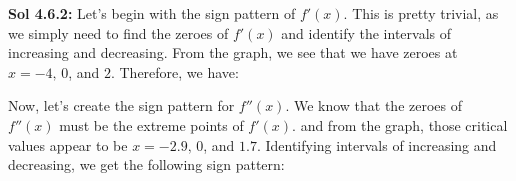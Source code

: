 \begin{tcolorbox}[solution]
    \textbf{Sol 4.6.2: } Let's begin with the sign pattern of $f'(x)$. This is pretty trivial, as we simply need to find the zeroes of $f'(x)$ and identify the intervals of increasing and decreasing. From the graph, we see that we have zeroes at $x = -4, \, 0$, and $2$. Therefore, we have: \\
    \begin{center}
    \end{center} \vspace{11pt}

    Now, let's create the sign pattern for $f''(x)$. We know that the zeroes of $f''(x)$ must be the extreme points of $f'(x)$. and from the graph, those critical values appear to be $x = -2.9, \, 0$, and $1.7$. Identifying intervals of increasing and decreasing, we get the following sign pattern: \\
    \begin{center}
    \end{center}
\end{tcolorbox} \vspace{11pt}

